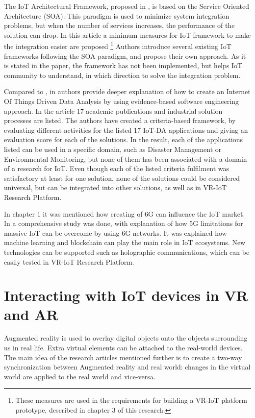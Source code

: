 The IoT Architectural Framework, proposed in \cite{uviase_iot_2018}, is based on the Service Oriented Architecture (SOA). This paradigm is used to minimize system integration problems, but when the number of services increases, the performance of the solution can drop. In this article a minimum measures for IoT framework to make the integration easier are proposed \footnote{These measures are used in the requirements for building a VR-IoT platform prototype, described in chapter 3 of this research.} Authors introduce several existing IoT frameworks following the SOA paradigm, and propose their own approach. As it is stated in the paper, the framework has not been implemented, but helps IoT community to understand, in which direction to solve the integration problem.

Compared to \cite{k_mohapatra_solution_2016}, in \cite{ahmad_software_2021} authors provide deeper explanation of how to create an Internet Of Things Driven Data Analysis by using evidence-based software engineering approach. In the article 17 academic publications and industrial solution processes are listed. The authors have created a criteria-based framework, by evaluating different activities for the listed 17 IoT-DA applications and giving an evaluation score for each of the solutions. In the result, each of the applications listed can be used in a specific domain, such as Disaster Management or Environmental Monitoring, but none of them has been associated with a domain of a research for IoT. Even though each of the listed criteria fulfilment was satisfactory at least for one solution, none of the solutions could be considered universal, but can be integrated into other solutions, as well as in VR-IoT Research Platform.

In chapter 1 it was mentioned how creating of 6G can influence the IoT market. In \cite{guo_enabling_2021} a comprehensive study was done, with explanation of how 5G limitations for massive IoT can be overcome by using 6G networks. It was explained how machine learning and blockchain can play the main role in IoT ecosystems. New technologies can be supported such as holographic communications, which can be easily tested in VR-IoT Research Platform.

\section{Interacting with IoT devices in VR and AR}

Augmented reality is used to overlay digital objects onto the objects surrounding us in real life. Extra virtual elements can be attached to the real-world devices. The main idea of the research articles mentioned further is to create a two-way synchronization between Augmented reality and real world: changes in the virtual world are applied to the real world and vice-versa.


